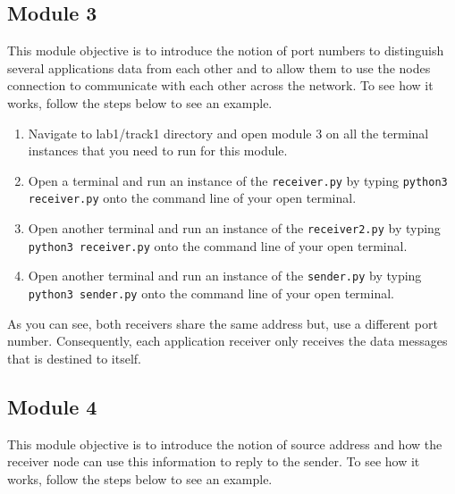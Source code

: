 \documentclass[11pt]{article}
\begin{document}
\subsection{Module 3}
\label{subsec:module3}
This module objective is to introduce the notion of port numbers to distinguish several applications data from each other and to allow them to use the nodes connection to communicate with each other across the network. To see how it works, follow the steps below to see an example.


\begin{enumerate}
    \item Navigate to lab1/track1 directory and open module 3 on all the terminal instances that you need to run for this module.
    \item Open a terminal and run an instance of the \texttt{receiver.py} by typing \texttt{python3 receiver.py} onto the command line of your open terminal.
    \item Open another terminal and run an instance of the \texttt{receiver2.py} by typing \texttt{python3 receiver.py} onto the command line of your open terminal.
    \item Open another terminal and run an instance of the \texttt{sender.py} by typing \texttt{python3 sender.py} onto the command line of your open terminal.
\end{enumerate}

As you can see, both receivers share the same address but, use a different port number. Consequently, each application receiver only receives the data messages that is destined to itself.



\subsection{Module 4}
\label{subsec:module4}
This module objective is to introduce the notion of source address and how the receiver node can use this information to reply to the sender. To see how it works, follow the steps below to see an example.
\end{document}

